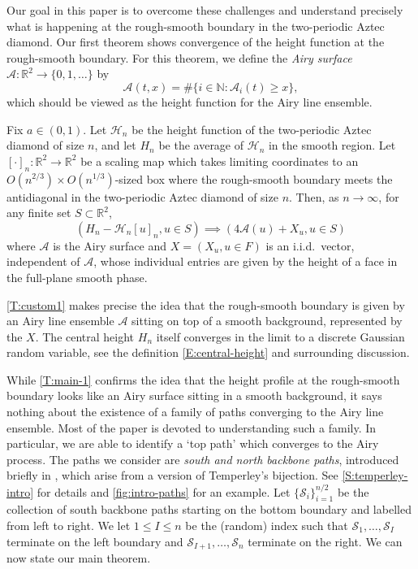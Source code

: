\documentclass[11pt,twoside]{amsart}
\newenvironment{customthm}[1]
{\renewcommand\theinnercustomthm{#1}\innercustomthm}
  {\endinnercustomthm}
\theoremstyle{plain}
\numberwithin{quest}{section}
\theoremstyle{remark}
\numberwithin{rem}{section}
\theoremstyle{definition}
\newcommand{\N}{\mathbb{N}}
\newcommand{\R}{\mathbb{R}}
\begin{document}
Our goal in this paper is to overcome these challenges and understand precisely what is happening at the rough-smooth boundary in the two-periodic Aztec diamond. Our first theorem shows convergence of the height function at the rough-smooth boundary.  For this theorem, we define the \textit{Airy surface} $\mathcal A:\R^2 \to \{0, 1, \dots\}$ by 
$$
\mathcal A(t, x) = \# \{i \in \N : \mathcal A_i(t) \ge x\},
$$
which should be viewed as the height function for the Airy line ensemble.

\begin{customthm}{1}[Informal version of \cref{T:main-1}]
\label{T:custom1}
Fix $a \in (0, 1)$. Let $\mathcal{H}_n$ be the height function of the two-periodic Aztec diamond of size $n$, and let $H_n$ be the average of $\mathcal H_n$ in the smooth region. Let $[\cdot]_n:\R^2 \to \R^2$ be a scaling map which takes limiting coordinates to an $O(n^{2/3}) \times O(n^{1/3})$-sized box where the rough-smooth boundary meets the antidiagonal in the two-periodic Aztec diamond of size $n$. Then, as $n\to \infty$, for any finite set $S \subset \R^2$,
\begin{equation*}
(H_n-\mathcal{H}_n[u]_n, u \in S) \implies (4\mathcal{A}(u) + X_u, u \in S)
\end{equation*}
where $\mathcal{A}$ is the Airy surface and $X = (X_u, u \in F)$ is an i.i.d.\ vector, independent of $\mathcal A$, whose individual entries are given by the  height of a face in the full-plane smooth phase.
\end{customthm}

\cref{T:custom1} makes precise the idea that the rough-smooth boundary is given by an Airy line ensemble $\mathcal A$ sitting on top of a smooth background, represented by the $X$. The central height $H_n$ itself converges in the limit to a discrete Gaussian random variable, see the definition \eqref{E:central-height} and surrounding discussion. 


While \cref{T:main-1} confirms the idea that the height profile at the rough-smooth boundary looks like an Airy surface sitting in a smooth background, it says nothing about the existence of a family of paths converging to the Airy line ensemble. 
Most of the paper is devoted to understanding such a family. In particular, we are able to identify a `top path' which converges to the Airy process. The paths we consider are \textit{south and north backbone paths}, introduced briefly in \cite{CJ16}, which arise from a version of Temperley's bijection. See \cref{S:temperley-intro} for details and \cref{fig:intro-paths} for an example. Let $\{\mathcal S_i\}_{i=1}^{n/2}$ be the collection of south backbone paths starting on the bottom boundary and labelled from left to right. We let $1\leq I \leq n$ be the (random) index such that $\mathcal S_1,\dots, \mathcal S_I$ terminate on the left boundary and $\mathcal S_{I+1},\dots, \mathcal S_n$ terminate on the right. We can now state our main theorem. 
\end{document}
